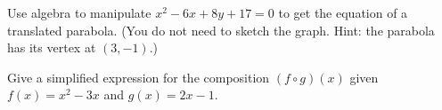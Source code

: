 \documentclass[12pt]{exam}
\newcommand{\<}{\langle}
\renewcommand{\>}{\rangle}
\begin{document}
\begin{questions}
\newpage

\question[20]
  Use algebra to manipulate \(x^2-6x+8y+17=0\) to get the equation of
  a translated parabola. (You do not need to sketch
  the graph. Hint: the parabola has its vertex at \((3,-1)\).)

\newpage

\question[20]
  Give a simplified expression for the composition \((f\circ g)(x)\) given
  \(f(x)=x^2-3x\) and \(g(x)=2x-1\).

\end{questions}
\end{document}
